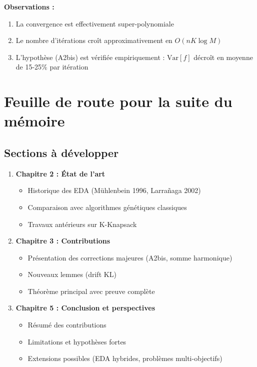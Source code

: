 \documentclass[12pt,a4paper]{article}
\theoremstyle{definition}
\theoremstyle{remark}
\newcommand{\Var}{\text{Var}}
\begin{document}
\textbf{Observations :}
\begin{enumerate}
\item La convergence est effectivement super-polynomiale
\item Le nombre d'itérations croît approximativement en $O(nK \log M)$
\item L'hypothèse (A2bis) est vérifiée empiriquement : $\Var[f]$ décroît en moyenne de 15-25\% par itération
\end{enumerate}

\section{Feuille de route pour la suite du mémoire}

\subsection{Sections à développer}

\begin{enumerate}
\item \textbf{Chapitre 2 : État de l'art}
\begin{itemize}
	\item Historique des EDA (Mühlenbein 1996, Larrañaga 2002)
	\item Comparaison avec algorithmes génétiques classiques
	\item Travaux antérieurs sur K-Knapsack
\end{itemize}

\item \textbf{Chapitre 3 : Contributions}
\begin{itemize}
	\item Présentation des corrections majeures (A2bis, somme harmonique)
	\item Nouveaux lemmes (drift KL)
	\item Théorème principal avec preuve complète
\end{itemize}



\item \textbf{Chapitre 5 : Conclusion et perspectives}
\begin{itemize}
	\item Résumé des contributions
	\item Limitations et hypothèses fortes
	\item Extensions possibles (EDA hybrides, problèmes multi-objectifs)
\end{itemize}
\end{enumerate}
\end{document}

